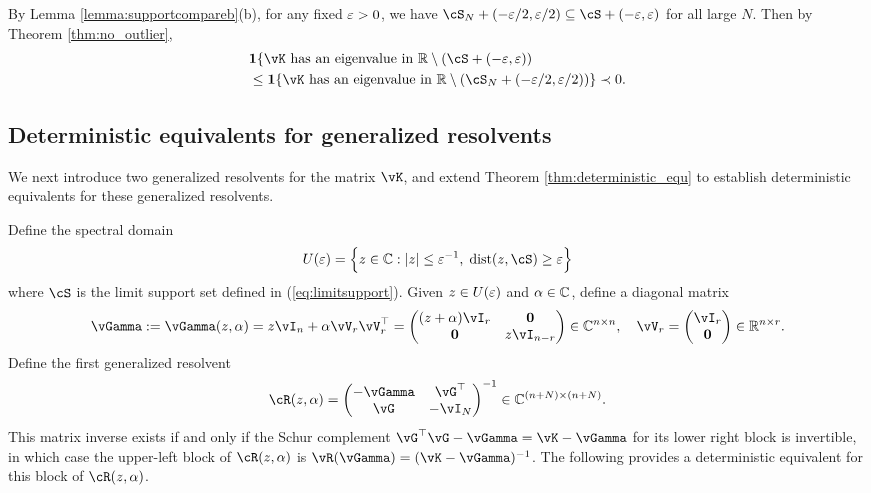 \begin{proof-of-coro}[\ref{cor:no_outlier}]
By Lemma \ref{lemma:supportcompareb}(b), for any fixed $\varepsilon>0$, we have
$\cS_N+(-\eps/2,\eps/2) \subseteq \cS+(-\eps,\eps)$
for all large $N$. Then by Theorem \ref{thm:no_outlier},
\begin{align*}
&\bI\{\vK \text{ has an eigenvalue in } \R \setminus (\cS+(-\eps,\eps))\\
&\leq \bI\{\vK \text{ has an eigenvalue in } \R \setminus
(\cS_N+(-\eps/2,\eps/2))\} \prec 0.
\end{align*}
\end{proof-of-coro}

\subsection{Deterministic equivalents for generalized resolvents}

We next introduce two generalized resolvents for the matrix $\vK$, and extend
Theorem \ref{thm:deterministic_equ} to establish
deterministic equivalents for these generalized resolvents.

Define the spectral domain
\[U(\eps)=\Big\{z \in \C:|z| \leq \eps^{-1},\;\dist{z,\cS} \geq \eps\Big\}\]
where $\cS$ is the limit support set defined in (\ref{eq:limitsupport}).
Given $z \in U(\varepsilon)$ and $\alpha \in \mathbb{C}$, define a diagonal matrix
\begin{equation}\label{eq:Gamma}
\vGamma:=\vGamma(z,\alpha)=z\vI_n+\alpha\vV_r\vV_r^\top
=\begin{pmatrix} (z+\alpha)\vI_r & \mathbf{0} \\
\mathbf{0} & z \vI_{n-r} \end{pmatrix} \in \C^{n \times n},
\quad \vV_r=\begin{pmatrix} \vI_r \\ \mathbf{0} \end{pmatrix}
\in \R^{n \times r}.
\end{equation}
Define the first generalized resolvent
\begin{equation}\label{eq:matrix_block}
\vcR(z,\alpha)=
\begin{pmatrix}
	-\vGamma & \vG^\top\\ \vG & -\vI_N
\end{pmatrix}^{-1} \in \C^{(n+N)\times (n+N)}.
\end{equation}
This matrix inverse exists if and only if
the Schur complement $\vG^\top \vG-\vGamma=\vK-\vGamma$
for its lower right block is invertible, in which case the upper-left block of
$\vcR(z,\alpha)$ is $\vR(\vGamma)=(\vK-\vGamma)^{-1}$. The following
provides a deterministic equivalent for this block of $\vcR(z,\alpha)$.


